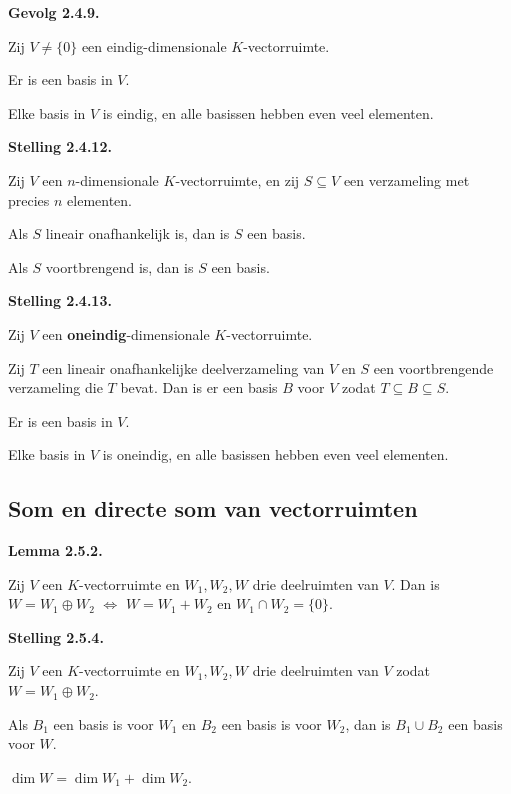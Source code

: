 \documentclass[10pt,a4paper]{article}
\newenvironment{res}[2]{%
  \par\noindent\textbf{#1 #2.}%
}{%
  \par\vspace{2pt}\normalfont
}
\begin{document}
\begin{res}{Gevolg}{2.4.9}
Zij $V\ne\{0\}$ een eindig-dimensionale $K$-vectorruimte.
\begin{myenum}
\item Er is een basis in $V$.
\item Elke basis in $V$ is eindig, en alle basissen hebben even veel elementen.
\end{myenum}
\end{res}

\begin{res}{Stelling}{2.4.12}
Zij $V$ een $n$-dimensionale $K$-vectorruimte, en zij $S\subseteq V$ een verzameling met precies $n$ elementen.
\begin{myenum}
\item Als $S$ lineair onafhankelijk is, dan is $S$ een basis.
\item Als $S$ voortbrengend is, dan is $S$ een basis.
\end{myenum}
\end{res}

\begin{res}{Stelling}{2.4.13}
Zij $V$ een \textbf{oneindig}-dimensionale $K$-vectorruimte.
\begin{myenum}
\item Zij $T$ een lineair onafhankelijke deelverzameling van $V$ en $S$ een voortbrengende verzameling die $T$ bevat. Dan is er een basis $B$ voor $V$ zodat $T\subseteq B\subseteq S$.
\item Er is een basis in $V$.
\item Elke basis in $V$ is oneindig, en alle basissen hebben even veel elementen.
\end{myenum}
\end{res}

\subsection{Som en directe som van vectorruimten}
\begin{res}{Lemma}{2.5.2}
Zij $V$ een $K$-vectorruimte en $W_1,W_2,W$ drie deelruimten van $V$. Dan is $W=W_1\oplus W_2$ \(\iff\) $W=W_1+W_2$ en $W_1\cap W_2=\{0\}$.
\end{res}

\begin{res}{Stelling}{2.5.4}
Zij $V$ een $K$-vectorruimte en $W_1,W_2,W$ drie deelruimten van $V$ zodat $W=W_1\oplus W_2$.
\begin{myenum}
\item Als $B_1$ een basis is voor $W_1$ en $B_2$ een basis is voor $W_2$, dan is $B_1\cup B_2$ een basis voor $W$.
\item $\dim W=\dim W_1+\dim W_2$.
\end{myenum}
\end{res}
\end{document}
